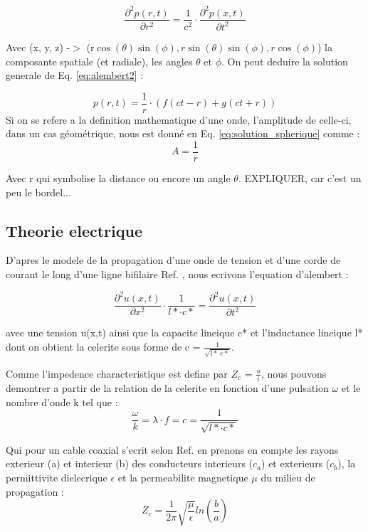 \begin{equation}
        \frac{\partial^2p(r,t)}{\partial r^2} = \frac{1}{c^2} \cdot \frac{\partial^2p(x,t)}{\partial t^2}
        \label{eq:alembert2}
\end{equation}

Avec (x, y, z) -$>$ (r$\cos(\theta)\sin(\phi), r\sin(\theta)\sin(\phi), r\cos(\phi)$) la composante spatiale (et radiale), les angles $\theta$ et $\phi$. On peut deduire la solution generale de Eq. \ref{eq:alembert2} :

\begin{equation}
	p(r,t) = \frac{1}{r} \cdot (f(ct-r) + g(ct + r))
	\label{eq:solution_spherique}
\end{equation}
Si on se refere a la definition mathematique d'une onde, l'amplitude de celle-ci, dans un cas géométrique, nous est donné en Eq. \ref{eq:solution_spherique} comme :
\begin{equation}
	\label{eq:decroissance}
	A = \frac{1}{r}
\end{equation}

Avec r qui symbolise la distance ou encore un angle $\theta$.
EXPLIQUER, car c'est un peu le bordel...
\subsection{Theorie electrique}

D'apres le modele de la propagation d'une onde de tension et d'une corde de courant le long d'une ligne bifilaire Ref. \cite{protocole}, nous ecrivons l'equation d'alembert :

\begin{equation}
        \frac{\partial^2u(x,t)}{\partial x^2} \cdot \frac{1}{l* \cdot c*} = \frac{\partial^2u(x,t)}{\partial t^2}
        \label{eq:alembert2}
\end{equation}

avec une tension u(x,t) ainsi que la capacite lineique c* et l'inductance lineique l*
dont on obtient la celerite sous forme de c = $\frac{1}{\sqrt{l* \cdot c*}}$. 

Comme l'impedence characteristique est define par $Z_c$ = $\frac{u}{i}$, nous pouvons demontrer a partir de la relation de la celerite en fonction d'une pulsation $\omega$ et le nombre d'onde k tel que : 
\begin{equation}
	\frac{\omega}{k} = \lambda \cdot f = c = \frac{1}{\sqrt{l* \cdot c*}}
	\label{eq:zc}
\end{equation}

Qui pour un cable coaxial s'ecrit selon Ref. \cite{protocol} en prenons en compte les rayons exterieur (a) et interieur (b) des conducteurs interieurs ($c_a$) et exterieurs ($c_b$), la permittivite dielecrique $\epsilon$ et la permeabilite magnetique $\mu$ du milieu de propagation :
\begin{equation}
	Z_c = \frac{1}{2\pi} \sqrt{\frac{\mu}{\epsilon}} ln(\frac{b}{a})
	\label{eq:zc2}
\end{equation}

